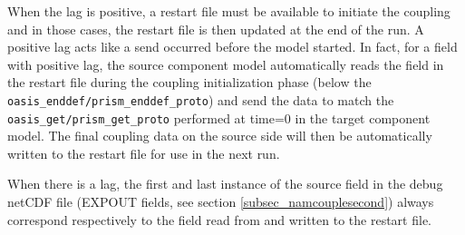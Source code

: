 When the lag is positive, a restart file must be available to initiate the coupling and in those cases, the restart file is then updated at the end of the run.  A positive lag acts like a send occurred before the model started. In fact, for a field with positive lag, the source component model automatically reads the field in the restart file during the coupling initialization phase (below the {\tt oasis\_enddef/prism\_enddef\_proto}) and send the data to match the {\tt oasis\_get/prism\_get\_proto} performed at time=0 in the target component model. The final coupling
data on the source side will then be automatically written to the restart file for use in the next run.  

When there is a lag, the first and last instance of the source field
in the debug netCDF file (EXPOUT fields, see section
\ref{subsec_namcouplesecond}) always correspond respectively to the field read from and written to the restart file.
 
